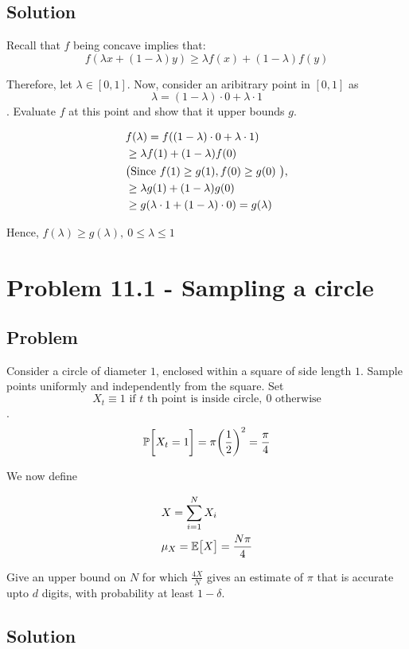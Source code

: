 \documentclass{article}
\begin{document}
 \subsection{Solution}

 Recall that $f$ being concave implies that:
 $$
 f(\lambda x + (1 - \lambda) y) \geq \lambda f(x) + (1 - \lambda) f(y)
 $$

 Therefore, let $\lambda \in [0, 1]$. Now, consider an aribitrary point
 in $[0, 1]$ as $$\lambda = (1 - \lambda) \cdot 0 + \lambda \cdot 1$$. Evaluate
 $f$ at this point and show that it upper bounds $g$.

 \begin{align*}
 &f(\lambda) = f((1 - \lambda) \cdot 0 + \lambda \cdot 1) \\
 &\geq \lambda f(1) + (1 - \lambda) f(0) \\
 &\text{\big(Since $f(1) \geq g(1), f(0) \geq g(0)$ \big),} \\
 &\geq \lambda g(1) + (1 - \lambda) g(0) \\
 &\geq g(\lambda \cdot 1 + (1 - \lambda) \cdot 0) = g(\lambda)
 \end{align*}

 Hence, $f(\lambda) \geq g(\lambda),~0 \leq \lambda \leq 1$

\section{Problem 11.1 - Sampling a circle}
\subsection{Problem}
Consider a circle of diameter $1$, enclosed within a square of side length $1$.
Sample points uniformly and independently from the square. Set
$$X_t \equiv \text{1 if $t$ th point is inside circle},~\text{$0$ otherwise}$$.
$$\mathbb{P}\bigg[ X_t = 1 \bigg] = \pi \bigg(\frac{1}{2}\bigg)^2 = \frac{\pi}{4}$$

We now define

\begin{align*}
&X = \sum_{i=1}^N X_i \\
&\mu_X = \mathbb{E}\big[ X \big] = \frac{N\pi}{4}
\end{align*}

Give an upper bound on $N$ for which $\frac{4X}{N}$ gives an estimate of $\pi$
that is accurate upto $d$ digits, with probability at least $1 - \delta$.
\subsection{Solution}
\end{document}
